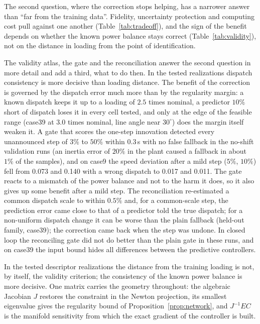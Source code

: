 \documentclass[preprint,12pt]{elsarticle}
\begin{document}
The second question, where the correction stops helping, has a narrower answer than ``far from the training data''. Fidelity, uncertainty protection and computing cost pull against one another (Table~\ref{tab:tradeoff}), and the sign of the benefit depends on whether the known power balance stays correct (Table~\ref{tab:validity}), not on the distance in loading from the point of identification.

The validity atlas, the gate and the reconciliation answer the second question in more detail and add a third, what to do then. In the tested realizations dispatch consistency is more decisive than loading distance. The benefit of the correction is governed by the dispatch error much more than by the regularity margin: a known dispatch keeps it up to a loading of $2.5$ times nominal, a predictor $10\%$ short of dispatch loses it in every cell tested, and only at the edge of the feasible range (case39 at $3.0$ times nominal, line angle near $30^\circ$) does the margin itself weaken it. A gate that scores the one-step innovation detected every unannounced step of $3\%$ to $50\%$ within $0.3$\,s with no false fallback in the no-shift validation runs (an inertia error of $20\%$ in the plant caused a fallback in about $1\%$ of the samples), and on case9 the speed deviation after a mild step ($5\%$, $10\%$) fell from 0.073 and 0.140 with a wrong dispatch to 0.017 and 0.011. The gate reacts to a mismatch of the power balance and not to the harm it does, so it also gives up some benefit after a mild step. The reconciliation re-estimated a common dispatch scale to within $0.5\%$ and, for a common-scale step, the prediction error came close to that of a predictor told the true dispatch; for a non-uniform dispatch change it can be worse than the plain fallback (held-out family, case39); the correction came back when the step was undone. In closed loop the reconciling gate did not do better than the plain gate in these runs, and on case39 the input bound hides all differences between the predictive controllers.

In the tested descriptor realizations the distance from the training loading is not, by itself, the validity criterion; the consistency of the known power balance is more decisive. One matrix carries the geometry throughout: the algebraic Jacobian $J$ restores the constraint in the Newton projection, its smallest eigenvalue gives the regularity bound of Proposition~\ref{prop:network}, and $J^{-1}EC$ is the manifold sensitivity from which the exact gradient of the controller is built.
\end{document}
